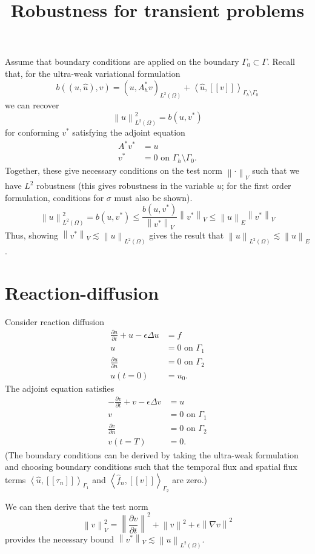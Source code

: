 \documentclass{article}
\title{Robustness for transient problems}
\newcommand{\grad}{\nabla}
\newcommand{\pd}[2]{\frac{\partial#1}{\partial#2}}
\newcommand{\nor}[1]{\left\| #1 \right\|}
\newcommand{\LRp}[1]{\left( #1 \right)}
\newcommand{\LRs}[1]{\left[ #1 \right]}
\newcommand{\LRa}[1]{\left\langle #1 \right\rangle}
\newcommand{\jump}[1] {\ensuremath{\LRs{\![#1]\!}}}
\newcommand{\uh}{\widehat{u}}
\newcommand{\fnh}{\widehat{f}_n}
\renewcommand{\L}{L^2\LRp{\Omega}}
\newcommand{\Gh}{\Gamma_h}
\begin{document}
\maketitle

Assume that boundary conditions are applied on the boundary $\Gamma_0\subset \Gamma$.  Recall that, for the ultra-weak variational formulation
\[
b\LRp{\LRp{u,\uh},v} = \LRp{u,A^*_h v}_{\L} + \LRa{\uh, \jump{v}}_{\Gh\setminus \Gamma_0}
\]
we can recover
\[
\nor{u}_{\L}^2 = b(u,v^*)
\]
for conforming $v^*$ satisfying the adjoint equation
\begin{align*}
A^* v^* &= u\\
v^* &= 0 \text{ on } \Gh\setminus\Gamma_0.
\end{align*}
Together, these give necessary conditions on the test norm $\nor{\cdot}_V$ such that we have $L^2$ robustness (this gives robustness in the variable $u$; for the first order formulation, conditions for $\sigma$ must also be shown).  
\[
\nor{u}_{\L}^2 = b(u,v^*) \leq \frac{b(u,v^*)}{\nor{v^*}_V} \nor{v^*}_V \leq \nor{u}_E \nor{v^*}_V
\]
Thus, showing $\nor{v^*}_V \lesssim \nor{u}_{\L}$ gives the result that $\nor{u}_{\L} \lesssim \nor{u}_E$.  


\section{Reaction-diffusion}

Consider reaction diffusion
\begin{align*}
\pd{u}{t} + u - \epsilon \Delta u &= f\\
u &= 0 \text{ on } \Gamma_1\\
\pd{u}{n} &= 0 \text{ on } \Gamma_2\\
u(t=0) &= u_0.
\end{align*}
The adjoint equation satisfies
\begin{align*}
-\pd{v}{t} + v - \epsilon \Delta v &= u\\
v &= 0 \text{ on } \Gamma_1\\
\pd{v}{n} &= 0 \text{ on } \Gamma_2\\
v(t=T) &= 0.
\end{align*}
(The boundary conditions can be derived by taking the ultra-weak formulation and choosing boundary conditions such that the temporal flux and spatial flux terms $\LRa{\uh, \jump{\tau_n}}_{\Gamma_1}$ and $\LRa{\fnh,\jump{v}}_{\Gamma_2}$ are zero.)

We can then derive that the test norm
\[
\nor{v}_V^2 = \nor{\pd{v}{t}}^2 + \nor{v}^2 + \epsilon\nor{\grad v}^2 
\]
provides the necessary bound $\nor{v^*}_V \lesssim \nor{u}_{\L}$.
\end{document}
